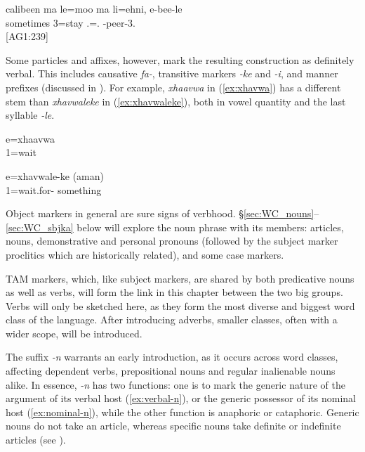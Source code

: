 \ea \label{ex:refl_nouns2}
\gll calibeen ma le=moo ma li=ehni, e-bee-le\\
 sometimes  3=stay  .=.  -peer-3.\\
\glt {} {[}AG1:239]
\z

Some particles and affixes, however, mark the resulting construction as definitely verbal. This includes causative \textit{fa-}, transitive markers \textit{-ke} and \textit{-i}, and manner prefixes (discussed in ). For example, \textit{xhaavwa} in (\ref{ex:xhavwa}) has a different stem than \textit{xhavwaleke} in (\ref{ex:xhavwaleke}), both in vowel quantity and the last syllable \textit{-le}.


\ea\label{ex:xhavwa}
\gll e=xhaavwa\\
 1=wait\\
\glt {}
\z

\ea\label{ex:xhavwaleke}
\gll e=xhavwale-ke (aman)\\
 1=wait.for- something\\ 
\glt {}
%
%
\z

Object markers in general are sure signs of verbhood. §\ref{sec:WC_nouns}--\ref{sec:WC_sbjka} below will explore the noun phrase with its members: articles, nouns, demonstrative and personal pronouns (followed by the subject marker proclitics which are historically related), and some case markers.

TAM markers, which, like subject markers, are shared by both predicative nouns as well as verbs, will form the link in this chapter between the two big groups. Verbs will only be sketched here, as they form the most diverse and biggest word class of the language. After introducing adverbs, smaller classes, often with a wider scope, will be introduced.

The suffix \textit{-n}  warrants an early introduction, as it occurs across word classes, affecting dependent verbs, prepositional nouns and regular inalienable nouns alike. In essence, \textit{-n} has two functions: one is to mark the generic nature of the argument of its verbal host (\ref{ex:verbal-n}), or the generic possessor of its nominal host (\ref{ex:nominal-n}), while the other function is anaphoric or cataphoric. Generic nouns do not take an article, whereas specific nouns take definite or indefinite articles (see ). 


